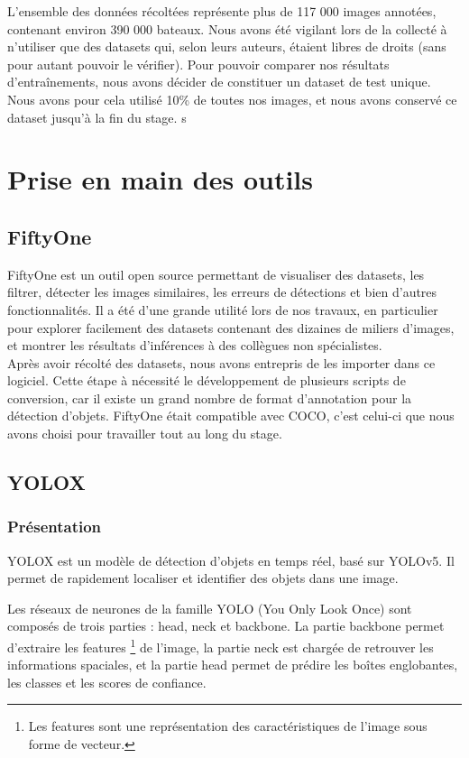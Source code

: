 L'ensemble des données récoltées représente plus de 117 000 images annotées, contenant environ 390 000 bateaux.
Nous avons été vigilant lors de la collecté à n'utiliser que des datasets qui, selon leurs auteurs,
étaient libres de droits (sans pour autant pouvoir le vérifier). 
Pour pouvoir comparer nos résultats d'entraînements, nous avons décider de constituer un dataset
de test unique. Nous avons pour cela utilisé 10\% de toutes nos images, et nous avons conservé ce dataset
jusqu'à la fin du stage. s

\section{Prise en main des outils}

\subsection{FiftyOne}

FiftyOne est un outil open source permettant de visualiser des datasets, les filtrer, 
détecter les images similaires, les erreurs de détections et bien d'autres fonctionnalités. 
Il a été d'une grande utilité lors de nos travaux, en particulier pour explorer facilement 
des datasets contenant des dizaines de miliers d'images, et montrer les résultats d'inférences
à des collègues non spécialistes.\\

Après avoir récolté des datasets, nous avons entrepris de les importer dans ce logiciel. Cette étape à 
nécessité le développement de plusieurs scripts de conversion, car il existe un grand nombre de format 
d'annotation pour la détection d'objets. FiftyOne était compatible avec COCO, c'est celui-ci que nous 
avons choisi pour travailler tout au long du stage.\\

\subsection{YOLOX}

\subsubsection{Présentation}

YOLOX est un modèle de détection d'objets en temps réel, basé sur YOLOv5. Il permet de rapidement 
localiser et identifier des objets dans une image. 

Les réseaux de neurones de la famille YOLO (You Only Look Once) sont composés de trois parties 
\cite{Redmon_Farhadi_2018} : head, neck et backbone. 
La partie backbone permet d'extraire les features \footnote{Les features sont une représentation des 
caractéristiques de l'image sous forme de vecteur.} de l'image, la partie neck est chargée de retrouver les informations spaciales,  
et la partie head permet de prédire les boîtes englobantes, les classes et les scores de confiance.\\

